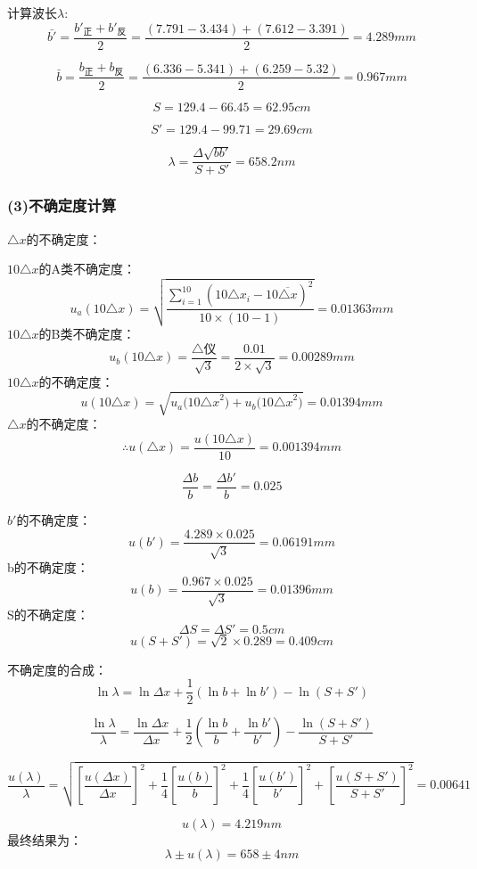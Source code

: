 \documentclass[11pt,a4paper,oneside]{article}
\begin{document}
计算波长$\lambda$:
$$\bar{b'} = \displaystyle\frac{b'_\text{正}+b'_\text{反}}{2} = \displaystyle\frac{ (7.791-3.434)+(7.612-3.391)}{2} = 4.289mm$$

$$\bar{b} = \displaystyle\frac{b_\text{正}+b_\text{反}}{2} = \displaystyle\frac{ (6.336-5.341)+(6.259-5.32)}{2} = 0.967mm$$

$$ S = 129.4 - 66.45 = 62.95cm$$

$$ S' = 129.4 - 99.71 = 29.69cm$$

$$ {\lambda} = \displaystyle\frac{{\Delta}\sqrt{bb'}}{S+S'} = 658.2nm$$

\subsubsection*{(3)不确定度计算}
${\triangle}x$的不确定度：

$10{\triangle}x$的A类不确定度：
$$u_a(10{\triangle}x) = \sqrt{\displaystyle\frac{\sum\limits_{i=1}^{10} (10{{\triangle}x}_i-{10\overline{{\triangle}x}})^2}{10{\times}(10-1)}} = 0.01363mm$$
$10{\triangle}x$的B类不确定度：
$$u_b({10{\triangle}x})=\displaystyle\frac{\bigtriangleup\text{仪}}{\sqrt{3}}
= \frac{0.01}{2{\times}\sqrt{3}} = 0.00289mm$$
$10{\triangle}x$的不确定度：
$$u(10{\triangle}x)=\sqrt{{u_a(10{\triangle}x}^2)+{u_b(10{\triangle}x}^2)} = 0.01394mm$$
${\triangle}x$的不确定度：
$${\therefore}u({\triangle}x) = \displaystyle\frac{u(10{\triangle}x)}{10} = 0.001394mm$$

$$ \displaystyle\frac{{\Delta}b}{b} = \displaystyle\frac{{\Delta}b'}{b} = 0.025 $$

$b'$的不确定度：
$$ u(b') = \displaystyle\frac{ 4.289{\times}0.025}{\sqrt{3}} =0.06191mm$$
b的不确定度：
$$ u(b) = \displaystyle\frac{ 0.967{\times}0.025}{\sqrt{3}} =0.01396mm$$
S的不确定度：
$${\Delta}S = {\Delta}S' = 0.5cm$$
$$ u(S+S') = \sqrt{2} {\times} 0.289 = 0.409cm$$

不确定度的合成：
$$ \ln{\lambda} = \ln{{\Delta}x}+ \displaystyle\frac{1}{2}(\ln{b}+\ln{b'}) - \ln(S+S')$$

$$\displaystyle\frac{\ln{\lambda}}{\lambda} = \displaystyle\frac{\ln{\Delta}x}{{\Delta}x}+\displaystyle\frac{1}{2}(\displaystyle\frac{\ln{b}}{b}+\displaystyle\frac{\ln{b'}}{b'}) - \displaystyle\frac{\ln{(S+S')}}{S+S'} $$

$$\displaystyle\frac{u({\lambda})}{\lambda} = \sqrt{ [{\frac{u({\Delta}x)}{{\Delta}x}}]^2+\frac{1}{4}[{\frac{u(b)}{b}}]^2 +\frac{1}{4}[{\frac{u(b')}{b'}}]^2 + [\frac{u(S+S')}{S+S'}]^2   } = 0.00641$$

$$ u({\lambda}) = 4.219 nm$$
最终结果为：
$$ {\lambda}{\pm}{u({\lambda})} = 658 {\pm} 4 nm $$
\end{document}
